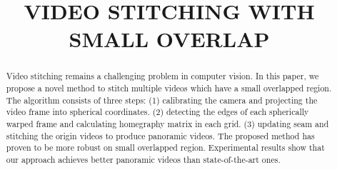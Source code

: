 \documentclass[conference]{IEEEtran}
\begin{document}
\title{VIDEO STITCHING WITH SMALL OVERLAP\\
}

\author{
\and
{}
}

\maketitle

\begin{abstract}
Video stitching remains a challenging problem in computer vision. In this paper, we propose a novel method to stitch multiple videos which have a small overlapped region.
The algorithm consists of three steps: (1) calibrating the camera and projecting the video frame into spherical coordinates. (2) detecting the edges of each spherically
warped frame 
and calculating homegraphy matrix in each grid. (3) updating seam and stitching the origin videos to produce panoramic videos. The proposed method has proven to be
more robust on small overlapped region. Experimental results show that our approach achieves better panoramic videos than state-of-the-art ones.
\end{abstract}
\end{document}

